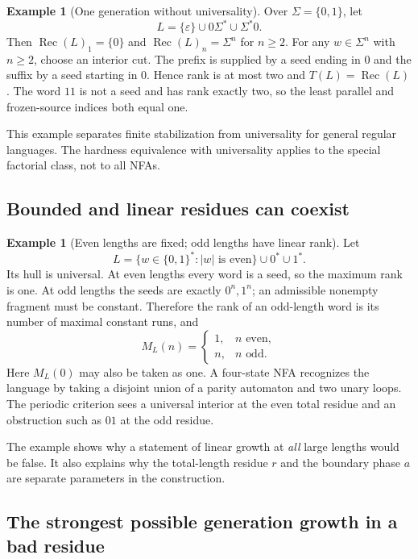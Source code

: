 \documentclass[11pt,letterpaper]{article}
\theoremstyle{definition}
\newtheorem{example}[theorem]{Example}
\theoremstyle{remark}
\newcommand{\eps}{\varepsilon}
\newcommand{\rec}{\operatorname{Rec}}
\begin{document}
\begin{example}[One generation without universality]\label{ccc:ps:ex:boundary}
Over $\Sigma=\{0,1\}$, let
\[
 L=\{\eps\}\cup0\Sigma^*\cup\Sigma^*0.
\]
Then $\rec(L)_1=\{0\}$ and $\rec(L)_n=\Sigma^n$ for $n\ge2$.
For any $w\in\Sigma^n$ with $n\ge2$, choose an interior cut.
The prefix is supplied by a seed ending in $0$ and the suffix by a seed
starting in $0$. Hence rank is at most two and $T(L)=\rec(L)$.
The word $11$ is not a seed and has rank exactly two, so the least
parallel and frozen-source indices both equal one.

This example separates finite stabilization from universality for general
regular languages. The hardness equivalence with universality applies to
the special factorial class, not to all NFAs.
\end{example}

\subsection{Bounded and linear residues can coexist}

\begin{example}[Even lengths are fixed; odd lengths have linear rank]
\label{ccc:ps:ex:parity}
Let
\[
 L=\{w\in\{0,1\}^*:|w|\text{ is even}\}\cup0^*\cup1^*.
\]
Its hull is universal. At even lengths every word is a seed, so the
maximum rank is one. At odd lengths the seeds are exactly $0^n,1^n$;
an admissible nonempty fragment must be constant. Therefore the rank of
an odd-length word is its number of maximal constant runs, and
\[
 M_L(n)=\begin{cases}1,&n\text{ even},\\n,&n\text{ odd}.
 \end{cases}
\]
Here $M_L(0)$ may also be taken as one. A four-state NFA recognizes the
language by taking a disjoint union of a parity automaton and two unary
loops. The periodic criterion sees a universal interior at the even total
residue and an obstruction such as $01$ at the odd residue.
\end{example}

The example shows why a statement of linear growth at \emph{all} large
lengths would be false. It also explains why the total-length residue $r$
and the boundary phase $a$ are separate parameters in the construction.

\subsection{The strongest possible generation growth in a bad residue}
\end{document}
